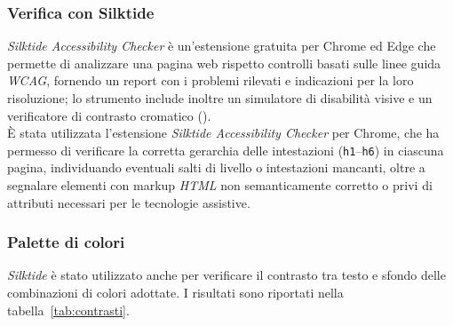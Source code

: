 \subsubsection{Verifica con Silktide}
\emph{Silktide Accessibility Checker} è un'estensione gratuita per Chrome ed Edge che permette di analizzare una pagina web rispetto controlli basati sulle linee guida \emph{WCAG}, fornendo un report con i problemi rilevati e indicazioni per la loro risoluzione; lo strumento include inoltre un simulatore di disabilità visive e un verificatore di contrasto cromatico (\cite{site:silktide}). \\

È stata utilizzata l'estensione \emph{Silktide Accessibility Checker} per Chrome, che ha permesso di verificare la corretta gerarchia delle intestazioni (\texttt{h1}–\texttt{h6}) in ciascuna pagina, individuando eventuali salti di livello o intestazioni mancanti, oltre a segnalare elementi con markup \emph{HTML} non semanticamente corretto o privi di attributi necessari per le tecnologie assistive.

\subsubsection{Palette di colori}
\emph{Silktide} è stato utilizzato anche per verificare il contrasto tra testo e sfondo delle combinazioni di colori adottate. I risultati sono riportati nella tabella~\ref{tab:contrasti}.

